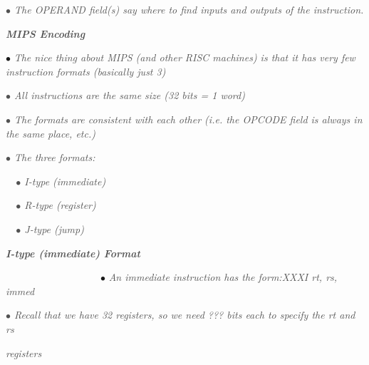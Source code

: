 \documentclass[12pt]{article}
\begin{document}
\textit{\textcolor[HTML]{525252}{ $\bullet$  The OPERAND field(s) say where to find inputs and outputs of the instruction.}}\par

{\fontsize{14pt}{16.8pt}\selectfont \textbf{\textit{\textcolor[HTML]{525252}{MIPS Encoding }}}\par}\par

$\bullet$  \textit{\textcolor[HTML]{525252}{The nice thing about MIPS (and other RISC machines) is that it has very few instruction formats (basically just 3) }}\par

\textit{\textcolor[HTML]{525252}{$\bullet$  All instructions are the same size (32 bits = 1 word) }}\par

\textit{\textcolor[HTML]{525252}{$\bullet$  The formats are consistent with each other (i.e. the OPCODE field is always in the same place, etc.) }}\par

\textit{\textcolor[HTML]{525252}{$\bullet$  The three formats:}}\par

\textit{\textcolor[HTML]{525252}{\ \  $\bullet$ I-type (immediate) }}\par

\textit{\textcolor[HTML]{525252}{\ \  $\bullet$ R-type (register) }}\par

\textit{\textcolor[HTML]{525252}{\ \  $\bullet$ J-type (jump)}}\par

{\fontsize{14pt}{16.8pt}\selectfont \textbf{\textit{\textcolor[HTML]{525252}{I-type (immediate) Format }}}\par}\par

\ \ \ \ \ \ \ \ \ \ \ \ \ \ \ \ \ \ \  $\bullet$  \textit{\textcolor[HTML]{525252}{An immediate instruction has the form:XXXI rt, rs, immed }}\par

\textit{\textcolor[HTML]{525252}{$\bullet$  Recall that we have 32 registers, so we need ??? bits each to specify the rt and rs }}\par

\textit{\textcolor[HTML]{525252}{registers\ \ \ \ \ \ \ \ \ \ \ \ \ \ \ \ \ \ \ \ \ \ \ \ \ \ \ \ \ \ \ \ \ \ \ \ \ \ \ \ \ \ \ \ \ \ \ \ \ \  \ \ \ \ \ \ \ \ \ \ \ \ \ \ \ \ \ \ \ \ \ \ \ \ \ \ \ \ \ \ \ \ \ \ \ \  }}\par
\end{document}
